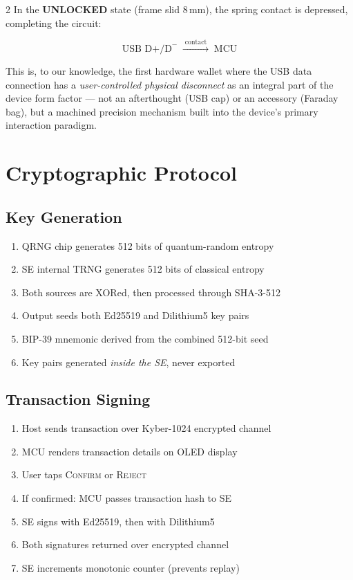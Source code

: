 \documentclass[11pt,a4paper]{article}
\begin{document}
\begin{multicols}{2}
In the \textbf{UNLOCKED} state (frame slid 8\,mm), the spring contact
is depressed, completing the circuit:

\begin{equation}
  \text{USB D+/D}^{-} \;\xrightarrow{\;\text{contact}\;}\; \text{MCU}
\end{equation}

This is, to our knowledge, the first hardware wallet where the
USB data connection has a \emph{user-controlled physical disconnect}
as an integral part of the device form factor --- not an afterthought
(USB cap) or an accessory (Faraday bag), but a machined precision
mechanism built into the device's primary interaction paradigm.

\section{Cryptographic Protocol}

\subsection{Key Generation}

\begin{enumerate}[leftmargin=1.2em,itemsep=2pt]
  \item QRNG chip generates 512 bits of quantum-random entropy
  \item SE internal TRNG generates 512 bits of classical entropy
  \item Both sources are XORed, then processed through SHA-3-512
  \item Output seeds both Ed25519 and Dilithium5 key pairs
  \item BIP-39 mnemonic derived from the combined 512-bit seed
  \item Key pairs generated \emph{inside the SE}, never exported
\end{enumerate}

\subsection{Transaction Signing}

\begin{enumerate}[leftmargin=1.2em,itemsep=2pt]
  \item Host sends transaction over Kyber-1024 encrypted channel
  \item MCU renders transaction details on OLED display
  \item User taps \textsc{Confirm} or \textsc{Reject}
  \item If confirmed: MCU passes transaction hash to SE
  \item SE signs with Ed25519, then with Dilithium5
  \item Both signatures returned over encrypted channel
  \item SE increments monotonic counter (prevents replay)
\end{enumerate}


\end{multicols}
\end{document}
